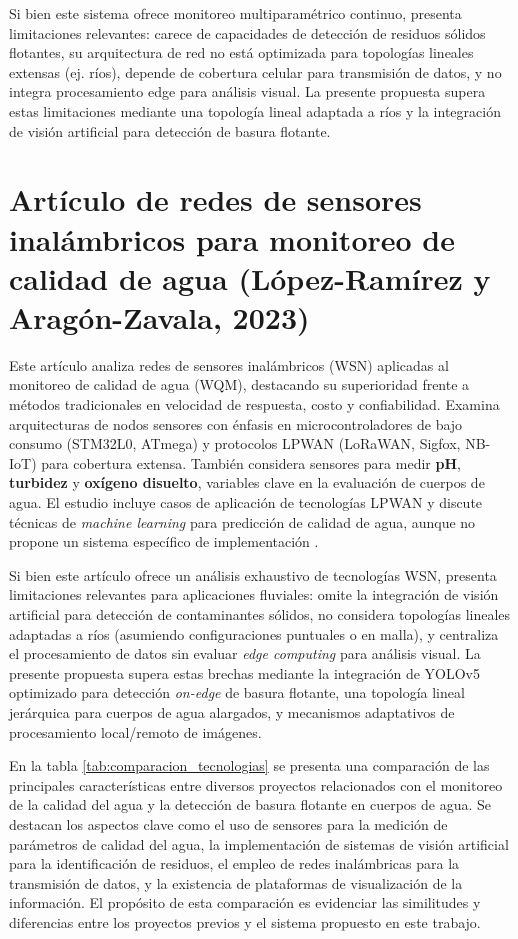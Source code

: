 Si bien este sistema ofrece monitoreo multiparamétrico continuo, presenta limitaciones relevantes: carece de capacidades de detección de residuos sólidos flotantes, su arquitectura de red no está optimizada para topologías lineales extensas (ej. ríos), depende de cobertura celular para transmisión de datos, y no integra procesamiento edge para análisis visual. La presente propuesta supera estas limitaciones mediante una topología lineal adaptada a ríos y la integración de visión artificial para detección de basura flotante.

\section{Artículo de redes de sensores inalámbricos para monitoreo de calidad de agua (López-Ramírez y Aragón-Zavala, 2023)}

Este artículo analiza redes de sensores inalámbricos (WSN) aplicadas al monitoreo de calidad de agua (WQM), destacando su superioridad frente a métodos tradicionales en velocidad de respuesta, costo y confiabilidad. Examina arquitecturas de nodos sensores con énfasis en microcontroladores de bajo consumo (STM32L0, ATmega) y protocolos LPWAN (LoRaWAN, Sigfox, NB-IoT) para cobertura extensa. También considera sensores para medir \textbf{pH}, \textbf{turbidez} y \textbf{oxígeno disuelto}, variables clave en la evaluación de cuerpos de agua. El estudio incluye casos de aplicación de tecnologías LPWAN y discute técnicas de \textit{machine learning} para predicción de calidad de agua, aunque no propone un sistema específico de implementación \cite{lopez2023}.


Si bien este artículo ofrece un análisis exhaustivo de tecnologías WSN, presenta limitaciones relevantes para aplicaciones fluviales: omite la integración de visión artificial para detección de contaminantes sólidos, no considera topologías lineales adaptadas a ríos (asumiendo configuraciones puntuales o en malla), y centraliza el procesamiento de datos sin evaluar \textit{edge computing} para análisis visual. La presente propuesta supera estas brechas mediante la integración de YOLOv5 optimizado para detección \textit{on-edge} de basura flotante, una topología lineal jerárquica para cuerpos de agua alargados, y mecanismos adaptativos de procesamiento local/remoto de imágenes.



En la tabla \ref{tab:comparacion_tecnologias} se presenta una comparación de las principales características entre diversos proyectos relacionados con el monitoreo de la calidad del agua y la detección de basura flotante en cuerpos de agua. Se destacan los aspectos clave como el uso de sensores para la medición de parámetros de calidad del agua, la implementación de sistemas de visión artificial para la identificación de residuos, el empleo de redes inalámbricas para la transmisión de datos, y la existencia de plataformas de visualización de la información. El propósito de esta comparación es evidenciar las similitudes y diferencias entre los proyectos previos y el sistema propuesto en este trabajo.



